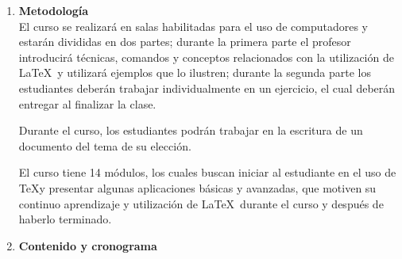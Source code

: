 \documentclass[12pt]{article}
\begin{document}
\begin{enumerate}[label={\bfseries\arabic*.}]
\item \textbf{Metodología}\\

El curso se realizará en salas habilitadas para el uso de computadores y estarán divididas en dos partes; durante la primera parte el profesor introducirá técnicas, comandos y conceptos relacionados con la utilización de \LaTeX\ y utilizará ejemplos que lo ilustren; durante la segunda parte los estudiantes deberán trabajar individualmente en un ejercicio, el cual deberán entregar al finalizar la clase.

Durante el curso, los estudiantes podrán trabajar en la escritura de un documento del tema de su elección. 

El curso tiene 14 módulos, los cuales buscan iniciar al estudiante en el uso de \TeX y presentar algunas aplicaciones básicas y avanzadas, que motiven su continuo aprendizaje y utilización de \LaTeX\ durante el curso y después de haberlo terminado.

\item \textbf{Contenido y cronograma}\\


\end{enumerate}
\end{document}

